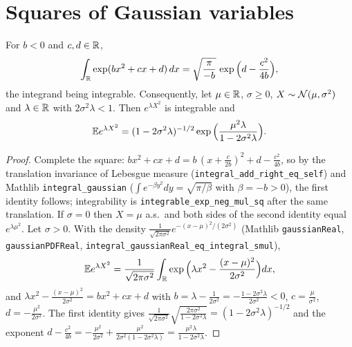 \section{Squares of Gaussian variables}
\label{sec:pre_subexp_gaussian}

\begin{lemma}\label{lem:gaussian_square_mgf}
\leanok
{}
For $b < 0$ and $c, d \in \mathbb{R}$,
\[
  \int_{\mathbb{R}} \exp(bx^2 + cx + d)\,dx = \sqrt{\frac{\pi}{-b}}\,\exp\Big(d - \frac{c^2}{4b}\Big),
\]
the integrand being integrable. Consequently, let $\mu \in \mathbb{R}$, $\sigma \ge 0$,
$X \sim \mathcal{N}(\mu,\sigma^2)$ and $\lambda \in \mathbb{R}$ with $2\sigma^2\lambda < 1$. Then
$e^{\lambda X^2}$ is integrable and
\[
  \mathbb{E} e^{\lambda X^2} = (1 - 2\sigma^2\lambda)^{-1/2}\exp\Big(\frac{\mu^2\lambda}{1 - 2\sigma^2\lambda}\Big).
\]
\end{lemma}

\begin{proof}
\leanok
{}
Complete the square: $bx^2 + cx + d = b\,(x + \frac{c}{2b})^2 + d - \frac{c^2}{4b}$, so by the
translation invariance of Lebesgue measure (\texttt{integral\_add\_right\_eq\_self}) and
Mathlib \texttt{integral\_gaussian} ($\int e^{-\beta y^2}dy = \sqrt{\pi/\beta}$ with
$\beta = -b > 0$), the first identity follows; integrability is
\texttt{integrable\_exp\_neg\_mul\_sq} after the same translation.
If $\sigma = 0$ then $X = \mu$ a.s.\ and both sides of the second identity equal
$e^{\lambda\mu^2}$. Let $\sigma > 0$. With the density
$\frac{1}{\sqrt{2\pi\sigma^2}}e^{-(x-\mu)^2/(2\sigma^2)}$ (Mathlib \texttt{gaussianReal},
\texttt{gaussianPDFReal}, \texttt{integral\_gaussianReal\_eq\_integral\_smul}),
\[
  \mathbb{E} e^{\lambda X^2} = \frac{1}{\sqrt{2\pi\sigma^2}}\int_{\mathbb{R}}\exp\Big(\lambda x^2 - \frac{(x-\mu)^2}{2\sigma^2}\Big)dx ,
\]
and $\lambda x^2 - \frac{(x-\mu)^2}{2\sigma^2} = bx^2 + cx + d$ with
$b = \lambda - \frac{1}{2\sigma^2} = -\frac{1-2\sigma^2\lambda}{2\sigma^2} < 0$,
$c = \frac{\mu}{\sigma^2}$, $d = -\frac{\mu^2}{2\sigma^2}$. The first identity gives
$\frac{1}{\sqrt{2\pi\sigma^2}}\sqrt{\frac{2\pi\sigma^2}{1-2\sigma^2\lambda}}
= (1-2\sigma^2\lambda)^{-1/2}$ and the exponent
$d - \frac{c^2}{4b} = -\frac{\mu^2}{2\sigma^2} + \frac{\mu^2}{2\sigma^2(1-2\sigma^2\lambda)}
= \frac{\mu^2\lambda}{1-2\sigma^2\lambda}$.
\end{proof}

